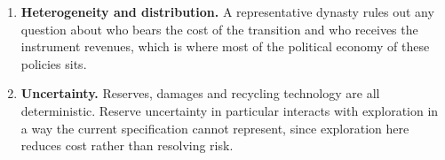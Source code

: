 \begin{enumerate}[label=\textbf{E\arabic*.},ref=E\arabic*,leftmargin=2.6em,itemsep=0.35em]
\item\label{ext:sp:hetero} \textbf{Heterogeneity and distribution.} A representative dynasty rules out
any question about who bears the cost of the transition and who receives the instrument revenues,
which is where most of the political economy of these policies sits.

\item\label{ext:sp:uncertainty} \textbf{Uncertainty.} Reserves, damages and recycling technology are
all deterministic. Reserve uncertainty in particular interacts with exploration in a way the current
specification cannot represent, since exploration here reduces cost rather than resolving risk.

\end{enumerate}
